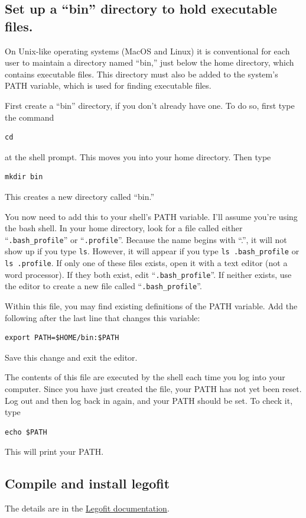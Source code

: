 \documentclass[11pt]{article}
\begin{document}
\subsection{Set up a ``bin'' directory to hold executable files.}
On Unix-like operating systems (MacOS and Linux) it is conventional
for each user to maintain a directory named ``bin,'' just below the
home directory, which contains executable files. This directory must
also be added to the system's PATH variable, which is used for finding
executable files.

First create a ``bin'' directory, if you don't already have one. To do
so, first type the command
\begin{verbatim}
cd
\end{verbatim}
at the shell prompt. This moves you into your home directory. Then
type
\begin{verbatim}
mkdir bin
\end{verbatim}
This creates a new directory called ``bin.''

You now need to add this to your shell's PATH variable. I'll assume
you're using the bash shell. In your home directory, look for a file
called either ``\verb|.bash_profile|'' or
``\texttt{.profile}''. Because the name begins with ``.'', it will not
show up if you type \texttt{ls}. However, it will appear if you type
\verb|ls .bash_profile| or \verb|ls .profile|. If only one of these
files exists, open it with a text editor (not a word processor). If
they both exist, edit ``\verb|.bash_profile|''. If neither exists, use
the editor to create a new file called ``\verb|.bash_profile|''.

Within this file, you may find existing definitions of the PATH
variable. Add the following after the last line that changes this
variable:
\begin{verbatim}
export PATH=$HOME/bin:$PATH
\end{verbatim}
Save this change and exit the editor.

The contents of this file are executed by the shell each time you log
into your computer. Since you have just created the file, your PATH
has not yet been reset. Log out and then log back in again, and your
PATH should be set. To check it, type
\begin{verbatim}
echo $PATH
\end{verbatim}
This will print your PATH.

\subsection{Compile and install legofit}
The details are in the
\href{http://alanrogers.github.io/legofit/html/index.html}{Legofit
  documentation}.
\end{document}

